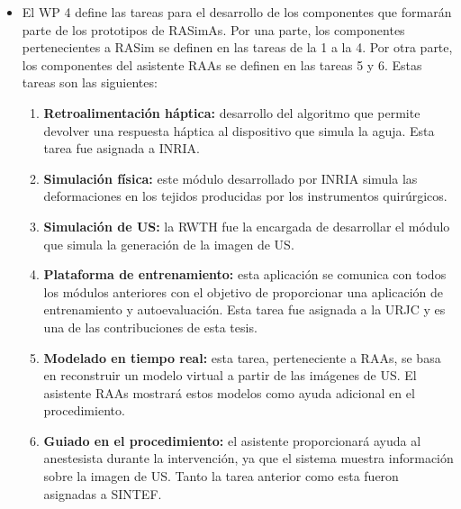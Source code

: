 \begin{itemize}
\item
El \ac{WP} 4 define las tareas para el desarrollo de los componentes que formarán parte de los prototipos de \ac{RASimAs}. Por una parte, los componentes pertenecientes a \ac{RASim} se definen en las tareas de la 1 a la 4. Por otra parte, los componentes del asistente \ac{RAAs} se definen en las tareas 5 y 6. Estas tareas son las siguientes:

\begin{enumerate}
    \item \textbf{Retroalimentación háptica:}
    desarrollo del algoritmo que permite devolver una respuesta háptica al dispositivo que simula la aguja. Esta tarea fue asignada a \ac{INRIA}.
    \item \textbf{Simulación física:}
    este módulo desarrollado por \ac{INRIA} simula las deformaciones en los tejidos producidas por los instrumentos quirúrgicos.
    \item \textbf{Simulación de \ac{US}:}
    la \ac{RWTH} fue la encargada de desarrollar el módulo que simula la generación de la imagen de \ac{US}.
    \item \textbf{Plataforma de entrenamiento:}
    esta aplicación se comunica con todos los módulos anteriores con el objetivo de proporcionar una aplicación de entrenamiento y autoevaluación. Esta tarea fue asignada a la \ac{URJC} y es una de las contribuciones de esta tesis.
    \item \textbf{Modelado en tiempo real:} esta tarea, perteneciente a \ac{RAAs}, se basa en reconstruir un modelo virtual a partir de las imágenes de \ac{US}. El asistente \ac{RAAs} mostrará estos modelos como ayuda adicional en el procedimiento.
    \item \textbf{Guiado en el procedimiento:}
    el asistente proporcionará ayuda al anestesista durante la intervención, ya que el sistema muestra información sobre la imagen de \ac{US}.
    Tanto la tarea anterior como esta fueron asignadas a \ac{SINTEF}.
\end{enumerate}


\end{itemize}
